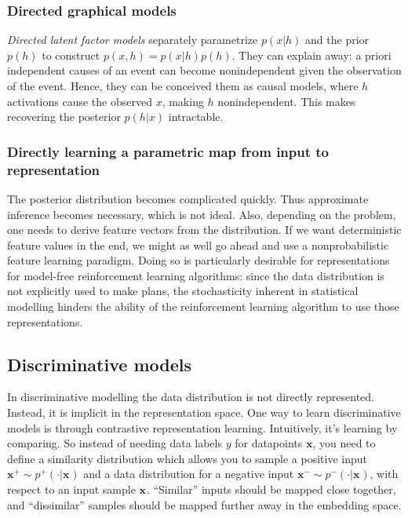 \subsubsection{Directed graphical models}
\textit{Directed latent factor models} separately parametrize
$ p (x|h)  $ and the prior $ p (h)  $ to construct
$ p (x,h) = p (x|h) p (h)  $.
They can explain away: a priori independent causes of an event
can become nonindependent given the observation of the event.
Hence, they can be conceived them as causal models, where $ h  $ activations
cause the observed $ x  $, making $ h  $ nonindependent.
This makes recovering the posterior $ p (h|x)  $ intractable.

\subsubsection{Directly learning a parametric map from input to representation}
The posterior distribution becomes complicated quickly.
Thus approximate inference becomes necessary, which is not ideal.
Also, depending on the problem, one needs to derive feature vectors
from the distribution.
If we want deterministic feature values in the end, we might as well
go ahead and use a nonprobabilistic feature learning paradigm.
Doing so is particularly desirable for representations for model-free 
reinforcement learning algorithms:
since the data distribution is not explicitly used to make plans,
the stochasticity inherent in statistical modelling hinders the ability
of the reinforcement learning algorithm to use those representations.


\subsection{Discriminative models}
In discriminative modelling the data distribution is not directly represented.
Instead, it is implicit in the representation space. 
One way to learn discriminative models is through contrastive representation learning.
Intuitively, it's learning by comparing.
So instead of needing data labels $ y  $ for datapoints $ \bm{x}$,
you need to define a similarity distribution which allows you to
sample a positive input $ \bm{x}_{}^{ + } \sim p^{ + } (\cdot | \bm{x}_{})  $
and a data distribution for a negative input $ \bm{x}_{}^{ - } \sim p^{ - } (\cdot | \bm{x}_{})  $,
with respect to an input sample $ \bm{x}_{}  $.
``Similar'' inputs should be mapped close together, and ``dissimilar'' samples
should be mapped further away in the embedding space.

